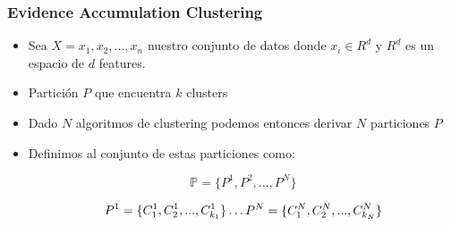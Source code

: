 \begin{frame}
\frametitle{Evidence Accumulation Clustering}

\begin{itemize}
    \item<1-> Sea $X = {x_1, x_2,...,x_n}$ nuestro conjunto de datos donde $x_i \in R^d$ y $R^d$ es un espacio de $d$ features.
    \item<2-> Partición $P$ que encuentra $k$ clusters
    \item<3-> Dado $N$ algoritmos de clustering podemos entonces derivar $N$ particiones $P$
    \item<4-> Definimos al conjunto de estas particiones como:

    \begin{equation}
    \mathbb{P} = \{P^1, P^2,...,P^N\}
    \end{equation}
    
    \begin{multline}
    \hfill
        \begin{split}
        P^1 = \{C^1_1, C^1_2,...,C^1_{k_1}\}
        \end{split} \hfill \break
    \hdots \hfill \break
        \begin{split}
        P^N = \{C^N_1, C^N_2,...,C^N_{k_N}\}
        \end{split}
    \hfill
    \end{multline}

\end{itemize}

\end{frame}

